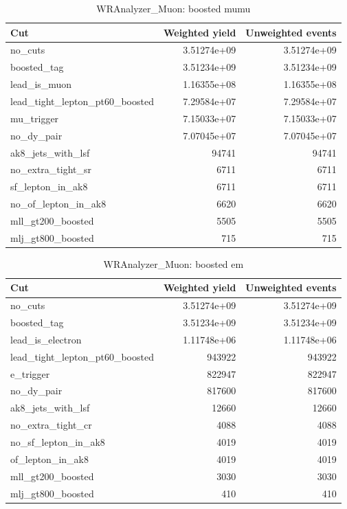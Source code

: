 \documentclass{article}
\begin{document}
\begin{table}[htbp]
\centering
\caption{WRAnalyzer\_Muon: boosted mumu}
\begin{tabular}{lrr}
\hline
Cut & Weighted yield & Unweighted events \\
\hline
no\_cuts & 3.51274e+09 & 3.51274e+09 \\
boosted\_tag & 3.51234e+09 & 3.51234e+09 \\
lead\_is\_muon & 1.16355e+08 & 1.16355e+08 \\
lead\_tight\_lepton\_pt60\_boosted & 7.29584e+07 & 7.29584e+07 \\
mu\_trigger & 7.15033e+07 & 7.15033e+07 \\
no\_dy\_pair & 7.07045e+07 & 7.07045e+07 \\
ak8\_jets\_with\_lsf & 94741 & 94741 \\
no\_extra\_tight\_sr & 6711 & 6711 \\
sf\_lepton\_in\_ak8 & 6711 & 6711 \\
no\_of\_lepton\_in\_ak8 & 6620 & 6620 \\
mll\_gt200\_boosted & 5505 & 5505 \\
mlj\_gt800\_boosted & 715 & 715 \\
\hline
\end{tabular}
\end{table}

\begin{table}[htbp]
\centering
\caption{WRAnalyzer\_Muon: boosted em}
\begin{tabular}{lrr}
\hline
Cut & Weighted yield & Unweighted events \\
\hline
no\_cuts & 3.51274e+09 & 3.51274e+09 \\
boosted\_tag & 3.51234e+09 & 3.51234e+09 \\
lead\_is\_electron & 1.11748e+06 & 1.11748e+06 \\
lead\_tight\_lepton\_pt60\_boosted & 943922 & 943922 \\
e\_trigger & 822947 & 822947 \\
no\_dy\_pair & 817600 & 817600 \\
ak8\_jets\_with\_lsf & 12660 & 12660 \\
no\_extra\_tight\_cr & 4088 & 4088 \\
no\_sf\_lepton\_in\_ak8 & 4019 & 4019 \\
of\_lepton\_in\_ak8 & 4019 & 4019 \\
mll\_gt200\_boosted & 3030 & 3030 \\
mlj\_gt800\_boosted & 410 & 410 \\
\hline
\end{tabular}
\end{table}
\end{document}
